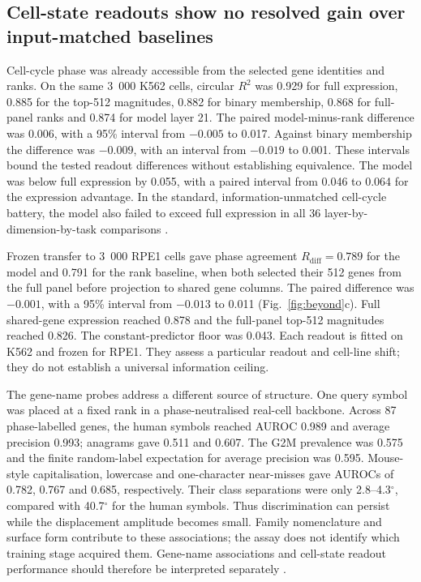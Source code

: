 \documentclass[review,authoryear,12pt]{elsarticle}
\begin{document}
\subsection{Cell-state readouts show no resolved gain over input-matched baselines}
\label{sec:celltasks}
Cell-cycle phase was already accessible from the selected gene identities and ranks.
On the same 3~000 K562 cells, circular $R^2$ was 0.929 for full expression, 0.885 for the top-512
magnitudes, 0.882 for binary membership, 0.868 for full-panel ranks and 0.874 for model layer 21.
The paired model-minus-rank difference was 0.006, with a 95\% interval from $-0.005$ to 0.017.
Against binary membership the difference was $-0.009$, with an interval from $-0.019$ to 0.001.
These intervals bound the tested readout differences without establishing equivalence.
The model was below full expression by 0.055, with a paired interval from 0.046 to 0.064 for the
expression advantage. In the standard, information-unmatched cell-cycle battery, the model also
failed to exceed full expression in all 36 layer-by-dimension-by-task comparisons \citep{ref5}.

Frozen transfer to 3~000 RPE1 cells gave phase agreement $R_{\mathrm{diff}}=0.789$ for the model
and 0.791 for the rank baseline, when both selected their 512 genes from the full panel before
projection to shared gene columns. The paired difference was $-0.001$, with a 95\% interval from
$-0.013$ to 0.011 (Fig.~\ref{fig:beyond}c). Full shared-gene expression reached 0.878 and the
full-panel top-512 magnitudes reached 0.826. The constant-predictor floor was 0.043.
Each readout is fitted on K562 and frozen for RPE1. They assess a particular
readout and cell-line shift; they do not establish a universal information ceiling.

The gene-name probes address a different source of structure. One query symbol was placed at a
fixed rank in a phase-neutralised real-cell backbone. Across 87 phase-labelled genes, the human
symbols reached AUROC 0.989 and average precision 0.993; anagrams gave 0.511 and 0.607.
The G2M prevalence was 0.575 and the finite random-label expectation for average precision was
0.595. Mouse-style capitalisation, lowercase and one-character near-misses gave AUROCs of
0.782, 0.767 and 0.685, respectively. Their class separations were only 2.8--4.3$^\circ$, compared
with 40.7$^\circ$ for the human symbols. Thus discrimination can persist while the displacement
amplitude becomes small. Family nomenclature and surface form contribute to these associations;
the assay does not identify which training stage acquired them. Gene-name associations and
cell-state readout performance should therefore be interpreted separately \citep{refProbeControls}.
\end{document}
